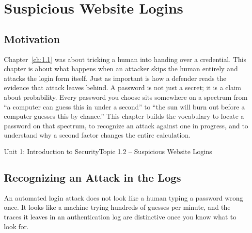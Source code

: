 \chapter{Suspicious Website Logins}
\label{ch:1.2}


\section{Motivation}

Chapter~\ref{ch:1.1} was about tricking a human into handing over a credential. This chapter is
about what happens when an attacker skips the human entirely and attacks the login form itself.
Just as important is how a defender reads the evidence that attack leaves behind. A
password is not just a secret; it is a claim about probability. Every password you choose sits
somewhere on a spectrum from ``a computer can guess this in under a second'' to ``the sun will
burn out before a computer guesses this by chance.'' This chapter builds the vocabulary to
locate a password on that spectrum, to recognize an attack against one in progress, and to
understand why a second factor changes the entire calculation.

\begin{apalignment}{Unit 1: Introduction to Security}{Topic 1.2 -- Suspicious Website Logins}
\begin{apobjectives}
\end{apobjectives}
\end{apalignment}

\section{Recognizing an Attack in the Logs}

An automated login attack does not look like a human typing a password wrong once. It looks like
a machine trying hundreds of guesses per minute, and the traces it leaves in an authentication
log are distinctive once you know what to look for.

